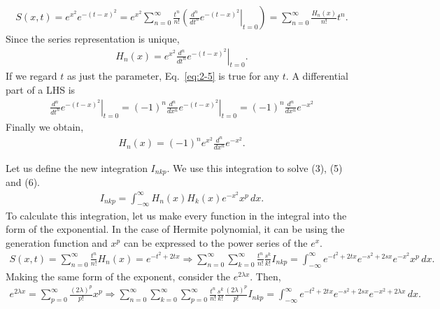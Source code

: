 \documentclass[floatfix,nofootinbib,superscriptaddress,fleqn]{revtex4-2}
\begin{document}
\begin{itemize}
\begin{align}
  S(x,t) = e^{x^2}e^{-(t-x)^2} = \left.e^{x^2}\sum^\infty_{n=0}\frac{t^n}{n!}
  \left(\frac{d^n}{dt^n}e^{-(t-x)^2}\right|_{t=0} \right)
  = \sum^\infty_{n=0}\frac{H_n(x)}{n!}t^n.
\end{align}
Since the series representation is unique,
\begin{align}\label{eq:2-5}
  H_n(x)=e^{x^2}\left.\frac{d^n}{dt^n}e^{-(t-x)^2}\right|_{t=0}.
\end{align}
If we regard $t$ as just the parameter, Eq.~\eqref{eq:2-5} is true for 
any $t$. 
A differential part of a LHS is
\begin{align}
  \left.\frac{d^n}{dt^n}e^{-(t-x)^2}\right|_{t=0}
  =\left.(-1)^n\frac{d^n}{dx^n}e^{-(t-x)^2}\right|_{t=0}
  =(-1)^n\frac{d^n}{dx^n}e^{-x^2}
\end{align}
Finally we obtain,
\begin{align}\label{eq:2-5-1}
  H_n(x) = (-1)^ne^{x^2}\frac{d^n}{dx^n}e^{-x^2}.
\end{align}
\end{itemize}
Let us define the new integration $I_{nkp}$.
We use this integration to solve (3), (5) and (6).
\begin{align}\label{eq:2-7-1}
  I_{nkp} = \int^{\infty}_{-\infty}H_n(x)H_k(x)e^{-x^2}x^p\,dx.
\end{align}
To calculate this integration, let us make every function 
in the integral into the form of the exponential.
In the case of Hermite polynomial, it can be using the generation function
and $x^p$ can be expressed to the power series of the $e^x$.
\begin{align}\label{eq:2-7-2}
  S(x,t) = \sum_{n=0}^\infty \frac{t^n}{n!}H_n(x)=e^{-t^2+2tx}
  \Longrightarrow \sum_{n=0}^\infty\sum_{k=0}^\infty \frac{t^n}{n!}\frac{s^k}{k!}
  I_{nkp}
  = \int^{\infty}_{-\infty}e^{-t^2+2tx}e^{-s^2+2sx}e^{-x^2}x^p\,dx.
\end{align}
Making the same form of the exponent, consider the $e^{2\lambda x}$. Then,
\begin{align}\label{eq:2-7-3}
  e^{2\lambda x} = \sum_{p=0}^{\infty}\frac{(2\lambda)^p}{p!}x^p
  \Longrightarrow \sum_{n=0}^\infty\sum_{k=0}^\infty\sum_{p=0}^{\infty}
  \frac{t^n}{n!}\frac{s^k}{k!}\frac{(2\lambda)^p}{p!}
  I_{nkp}
  = \int^{\infty}_{-\infty}e^{-t^2+2tx}e^{-s^2+2sx}e^{-x^2+2\lambda x}\,dx.
\end{align}
\end{document}
